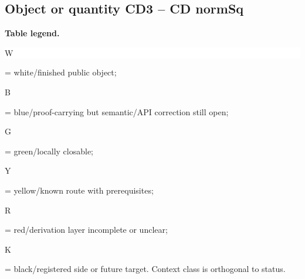 \subsection*{Object or quantity CD3 -- CD normSq}
\hypertarget{objproof:CD3}{}
\par\smallskip\noindent\begin{minipage}{0.99\linewidth}\footnotesize\raggedright\textbf{Table legend.} \colorbox{white}{\strut W} = white/finished public object; \colorbox{cyan!20}{\strut B} = blue/proof-carrying but semantic/API correction still open; \colorbox{green!18}{\strut G} = green/locally closable; \colorbox{yellow!25}{\strut Y} = yellow/known route with prerequisites; \colorbox{red!20}{\strut R} = red/derivation layer incomplete or unclear; \colorbox{black!18}{\strut K} = black/registered side or future target. Context class is orthogonal to status.\end{minipage}\par\vspace{0.25em}
